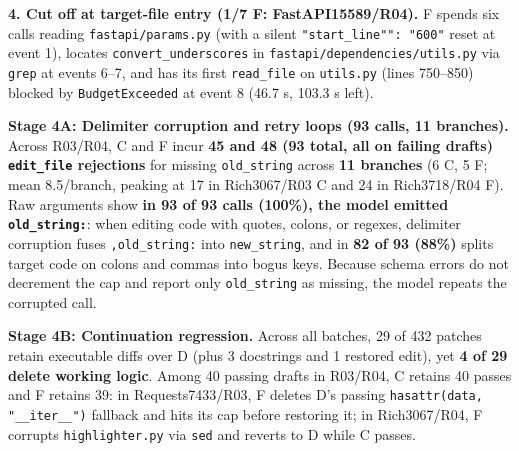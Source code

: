 \textbf{4. Cut off at target-file entry (1/7 F: FastAPI15589/R04).} F spends six calls reading \texttt{fastapi/params.py} (with a silent \texttt{"start\_line"": "600"} reset at event 1), locates \texttt{convert\_underscores} in \texttt{fastapi/dependencies/utils.py} via \texttt{grep} at events 6--7, and has its first \texttt{read\_file} on \texttt{utils.py} (lines 750--850) blocked by \texttt{BudgetExceeded} at event 8 (46.7 s, 103.3 s left).

\textbf{Stage 4A: Delimiter corruption and retry loops (93 calls, 11 branches).} Across R03/R04, C and F incur \textbf{45 and 48 (93 total, all on failing drafts) \texttt{edit\_file} rejections} for missing \texttt{old\_string} across \textbf{11 branches} (6 C, 5 F; mean 8.5/branch, peaking at 17 in Rich3067/R03 C and 24 in Rich3718/R04 F). Raw arguments show \textbf{in 93 of 93 calls (100\%), the model emitted \texttt{old\_string:}}: when editing code with quotes, colons, or regexes, delimiter corruption fuses \texttt{,old\_string:} into \texttt{new\_string}, and in \textbf{82 of 93 (88\%)} splits target code on colons and commas into bogus keys. Because schema errors do not decrement the cap and report only \texttt{old\_string} as missing, the model repeats the corrupted call.

\textbf{Stage 4B: Continuation regression.} Across all batches, 29 of 432 patches retain executable diffs over D (plus 3 docstrings and 1 restored edit), yet \textbf{4 of 29 delete working logic}. Among 40 passing drafts in R03/R04, C retains 40 passes and F retains 39: in Requests7433/R03, F deletes D's passing \texttt{hasattr(data, "\_\_iter\_\_")} fallback and hits its cap before restoring it; in Rich3067/R04, F corrupts \texttt{highlighter.py} via \texttt{sed} and reverts to D while C passes.
